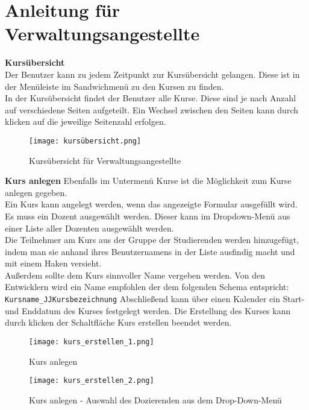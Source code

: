 
\chapter{Anleitung für Verwaltungsangestellte}
\label{sec:chap1}
\textbf{Kursübersicht}\\
Der Benutzer kann zu jedem Zeitpunkt zur Kursübersicht gelangen. Diese ist in der Menüleiste im Sandwichmenü zu den Kursen zu finden.\\
In der Kursübersicht findet der Benutzer alle Kurse. Diese sind je nach Anzahl auf verschiedene Seiten aufgeteilt. Ein Wechsel zwischen den Seiten kann durch klicken auf die jeweilige Seitenzahl erfolgen. 

\begin{figure}[h]
\centering
\texttt{[image: kursübersicht.png]}
\caption{Kursübersicht für Verwaltungsangestellte}
\label{fib:kü}
\end{figure}

\textbf{Kurs anlegen}
Ebenfalls im Untermenü Kurse ist die Möglichkeit zum Kurse anlegen gegeben.\\
Ein Kurs kann angelegt werden, wenn das angezeigte Formular ausgefüllt wird. Es muss ein Dozent ausgewählt werden. Dieser kann im Dropdown-Menü aus einer Liste aller Dozenten ausgewählt werden. \\
Die Teilnehmer am Kurs aus der Gruppe der Studierenden werden hinzugefügt, indem man sie anhand ihres Benutzernamens in der Liste ausfindig macht und mit einem Haken versieht. \\
Außerdem sollte dem Kurs sinnvoller Name vergeben werden. Von den Entwicklern wird ein Name empfohlen der dem folgenden Schema entspricht: \\
\verb/Kursname_JJKursbezeichnung/
Abschließend kann über einen Kalender ein Start- und Enddatum des Kurses festgelegt werden. 
Die Erstellung des Kurses kann durch klicken der Schaltfläche \glqq Kurs erstellen\grqq\: beendet werden.

\begin{figure}[h]
\centering
\texttt{[image: kurs\_erstellen\_1.png]}
\caption{Kurs anlegen}
\label{fib:kü}
\end{figure}

\begin{figure}[h]
\centering
\texttt{[image: kurs\_erstellen\_2.png]}
\caption{Kurs anlegen - Auswahl des Dozierenden aus dem Drop-Down-Menü}
\label{fib:kü}
\end{figure}

